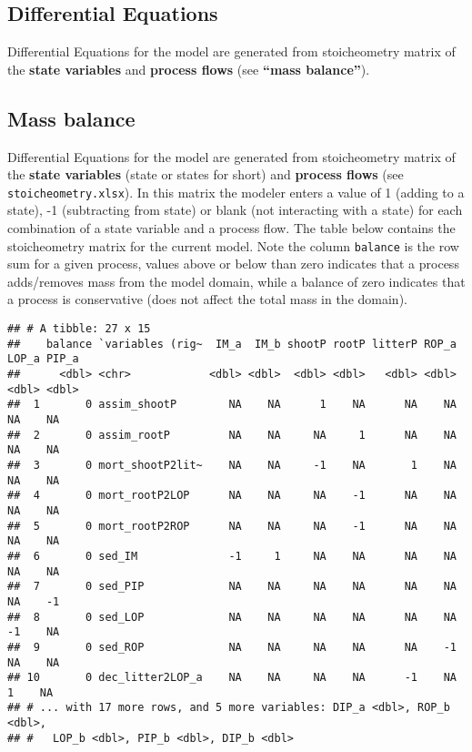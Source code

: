\documentclass[
]{article}
\begin{document}
\hypertarget{differential-equations}{%
\subsection{Differential Equations}\label{differential-equations}}

Differential Equations for the model are generated from stoicheometry
matrix of the \textbf{state variables} and \textbf{process flows} (see
\textbf{``mass balance''}).

\hypertarget{mass-balance}{%
\subsection{Mass balance}\label{mass-balance}}

Differential Equations for the model are generated from stoicheometry
matrix of the \textbf{state variables} (state or states for short) and
\textbf{process flows} (see \texttt{stoicheometry.xlsx}). In this matrix
the modeler enters a value of 1 (adding to a state), -1 (subtracting
from state) or blank (not interacting with a state) for each combination
of a state variable and a process flow. The table below contains the
stoicheometry matrix for the current model. Note the column
\texttt{balance} is the row sum for a given process, values above or
below than zero indicates that a process adds/removes mass from the
model domain, while a balance of zero indicates that a process is
conservative (does not affect the total mass in the domain).

\begin{verbatim}
## # A tibble: 27 x 15
##    balance `variables (rig~  IM_a  IM_b shootP rootP litterP ROP_a LOP_a PIP_a
##      <dbl> <chr>            <dbl> <dbl>  <dbl> <dbl>   <dbl> <dbl> <dbl> <dbl>
##  1       0 assim_shootP        NA    NA      1    NA      NA    NA    NA    NA
##  2       0 assim_rootP         NA    NA     NA     1      NA    NA    NA    NA
##  3       0 mort_shootP2lit~    NA    NA     -1    NA       1    NA    NA    NA
##  4       0 mort_rootP2LOP      NA    NA     NA    -1      NA    NA    NA    NA
##  5       0 mort_rootP2ROP      NA    NA     NA    -1      NA    NA    NA    NA
##  6       0 sed_IM              -1     1     NA    NA      NA    NA    NA    NA
##  7       0 sed_PIP             NA    NA     NA    NA      NA    NA    NA    -1
##  8       0 sed_LOP             NA    NA     NA    NA      NA    NA    -1    NA
##  9       0 sed_ROP             NA    NA     NA    NA      NA    -1    NA    NA
## 10       0 dec_litter2LOP_a    NA    NA     NA    NA      -1    NA     1    NA
## # ... with 17 more rows, and 5 more variables: DIP_a <dbl>, ROP_b <dbl>,
## #   LOP_b <dbl>, PIP_b <dbl>, DIP_b <dbl>
\end{verbatim}
\end{document}

